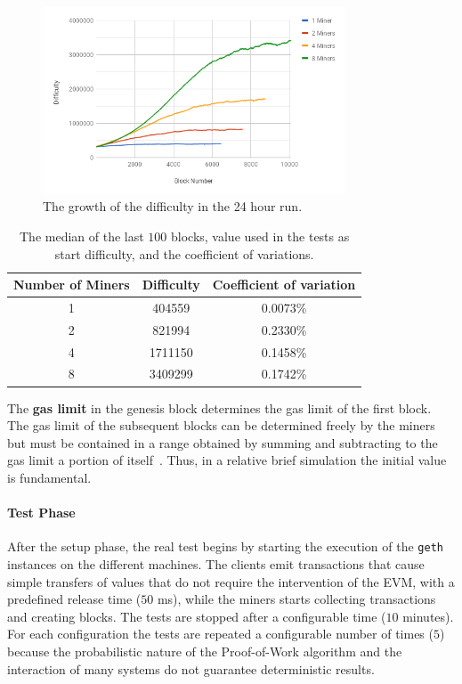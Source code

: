 \begin{figure}[h!]
  \begin{center}
    \includegraphics[width=0.8\textwidth]{./res/img/start_difficulty_all.png}
    \caption{The growth of the difficulty in the 24 hour run.}
    \label{fig:start_difficulty_raw}
  \end{center}
\end{figure}

\begin{table}[h!]
  \begin{center}
    \begin{tabular}{c | c | c}
      Number of Miners & Difficulty & Coefficient of variation \\
      \hline
      1 &  404559 & 0.0073\% \\
      2 &  821994 & 0.2330\%\\
      4 & 1711150 & 0.1458\%\\
      8 & 3409299 & 0.1742\%\\
    \end{tabular}
    \caption{The median of the last $100$ blocks, value used in the tests as
    start difficulty, and the coefficient of variations.}
    \label{table:start-difficulty}
  \end{center}
\end{table}

The \textbf{gas limit} in the genesis block determines the gas limit of the
first block. The gas limit of the subsequent blocks can be determined freely by
the miners but must be contained in a range obtained by summing and subtracting
to the gas limit a portion of itself~\cite{wood2018ethereum}. Thus, in a
relative brief simulation the initial value is fundamental.


\paragraph{Test Phase}
After the setup phase, the real test begins by starting the execution of the
\texttt{geth} instances on the different machines. The clients emit transactions
that cause simple transfers of values that do not require the intervention of
the EVM, with a predefined release time ($50$ ms), while the miners starts
collecting transactions and creating blocks. The tests are stopped after a
configurable time ($10$ minutes). For each configuration the tests are repeated
a configurable number of times ($5$) because the probabilistic nature of the
Proof-of-Work algorithm and the interaction of many systems do not guarantee
deterministic results.


